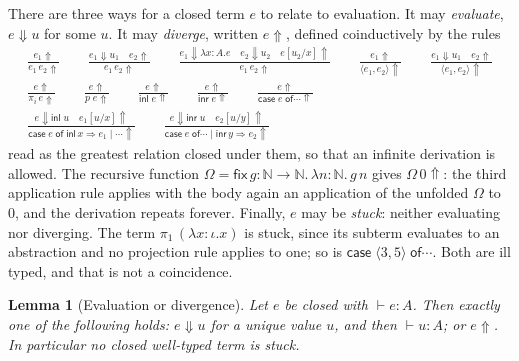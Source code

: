 \documentclass[11pt,openany]{book}
\newtheorem{lemma}[theorem]{Lemma}
\theoremstyle{remark}
\begin{document}
There are three ways for a closed term $e$ to relate to evaluation. It
may \emph{evaluate}, $e\Downarrow u$ for some $u$. It may \emph{diverge},
written $e\Uparrow$, defined coinductively by the rules
{\small
\[
\begin{gathered}
\frac{e_1\Uparrow}{e_1\,e_2\Uparrow}
\qquad
\frac{e_1\Downarrow u_1\quad e_2\Uparrow}{e_1\,e_2\Uparrow}
\qquad
\frac{e_1\Downarrow\lambda x{:}A.e\quad e_2\Downarrow u_2\quad
e[u_2/x]\Uparrow}{e_1\,e_2\Uparrow}
\qquad
\frac{e_1\Uparrow}{\langle e_1,e_2\rangle\Uparrow}
\qquad
\frac{e_1\Downarrow u_1\quad e_2\Uparrow}{\langle e_1,e_2\rangle\Uparrow}
\\[1.2ex]
\frac{e\Uparrow}{\pi_i\,e\Uparrow}
\qquad
\frac{e\Uparrow}{p\;e\Uparrow}
\qquad
\frac{e\Uparrow}{\mathsf{inl}\;e\Uparrow}
\qquad
\frac{e\Uparrow}{\mathsf{inr}\;e\Uparrow}
\qquad
\frac{e\Uparrow}{\mathsf{case}\;e\;\mathsf{of}\cdots\Uparrow}
\\[1.2ex]
\frac{e\Downarrow\mathsf{inl}\;u\quad e_1[u/x]\Uparrow}
{\mathsf{case}\;e\;\mathsf{of}\;\mathsf{inl}\,x\Rightarrow e_1\mid\cdots\Uparrow}
\qquad
\frac{e\Downarrow\mathsf{inr}\;u\quad e_2[u/y]\Uparrow}
{\mathsf{case}\;e\;\mathsf{of}\cdots\mid\mathsf{inr}\,y\Rightarrow e_2\Uparrow}
\end{gathered}
\]
}
read as the greatest relation closed under them, so that an infinite
derivation is allowed. The recursive function
$\Omega=\mathsf{fix}\,g{:}\mathbb N\to\mathbb N.\,\lambda n{:}\mathbb
N.\,g\,n$ gives $\Omega\,0\Uparrow$: the third application rule applies
with the body again an application of the unfolded $\Omega$ to $0$, and
the derivation repeats forever. Finally, $e$ may be \emph{stuck}: neither
evaluating nor diverging. The term $\pi_1\,(\lambda x{:}\iota.x)$ is
stuck, since its subterm evaluates to an abstraction and no projection
rule applies to one; so is $\mathsf{case}\;\langle 3,5\rangle\;\mathsf{of}
\cdots$. Both are ill typed, and that is not a coincidence.

\begin{lemma}[Evaluation or divergence]\label{lem:evdiv}
Let $e$ be closed with $\vdash e:A$. Then exactly one of the following
holds: $e\Downarrow u$ for a unique value $u$, and then $\vdash u:A$; or
$e\Uparrow$. In particular no closed well-typed term is stuck.
\end{lemma}
\end{document}
